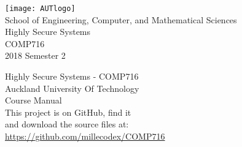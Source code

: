 \documentclass[a4paper,oneside]{book}
\begin{document}
  \newenvironment{theorem}[1]{\vspace{2mm}\noindent\textsc{#1}: }{\vspace{2mm}}
  \newtheorem{exercise}{Exercise}[chapter]

  \renewcommand{\Do}{\textbf{do}\addtocounter{indent}{1}}
  \renewcommand{\Then}{\textbf{then}\addtocounter{indent}{1}}
  \renewcommand{\Else}{\kill\addtocounter{indent}{-1}\liprint\textbf{else}\>\>\addtocounter{indent}{1}}
  \renewcommand{\ElseIf}{\kill\addtocounter{indent}{-1}\liprint\textbf{else if} }
  \renewcommand{\Until}{\kill\addtocounter{indent}{-1}\liprint\textbf{until}\hspace{1ex}}

 \frontmatter
 \begin{titlepage}
 	\begin{center}
 		
 		\texttt{[image: AUTlogo]}\\
 		{\vspace{2cm}}
 		{\Large School of Engineering, Computer, and Mathematical Sciences}
 		\vspace{3cm}\\
 		{\huge Highly Secure Systems}\\
 		\vspace{1cm}
 		{\huge COMP716} \\
 		\vspace{1cm}
 		{\huge 2018 Semester 2} \\
 		\vfill
 	\end{center}
 \end{titlepage}
 
 \clearpage\thispagestyle{empty}
   \vspace*{\fill}
 Highly Secure Systems - COMP716\\
 Auckland University Of Technology\\
 Course Manual\\
 
 This project is on GitHub, find it \\
 and download the source files at: \\
 \url{https://github.com/millecodex/COMP716} \\                            
                                                                      
\end{document}
